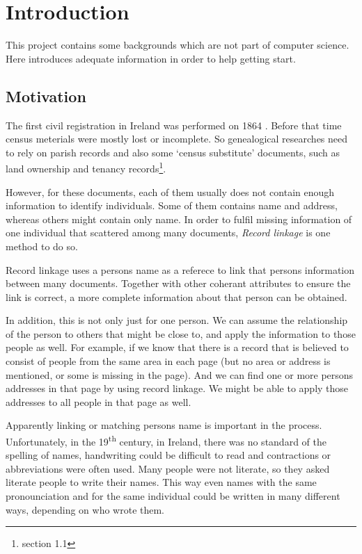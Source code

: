 \chapter{Introduction}
\label{ch:introduction}

This project contains some backgrounds which are not part of computer science.
Here introduces adequate information in order to help getting start.

\section{Motivation}

The first civil registration in Ireland was performed on 1864 \cite[]{irishregistration}.
Before that time census meterials were mostly lost or incomplete. So genealogical researches
need to rely on parish records and also some `census substitute' documents,
such as land ownership and tenancy records\footnote{\cite[]{adamw} section 1.1}.

However, for these documents, each of them usually does not contain enough
information to identify individuals. Some of them contains name and address,
whereas others might contain only name. In order to fulfil missing information
of one individual that scattered among many documents, \emph{Record linkage}
is one method to do so.


Record linkage uses a person\textquotesingle s name as a referece to link that
person\textquotesingle s information between many documents.
Together with other coherant attributes to ensure the link is correct, a
more complete information about that person can be obtained.

In addition, this is not only just for one person. We can assume the relationship
of the person to others that might be close to, and apply the information
to those people as well. For example, if we know that there is a record
that is believed to consist of people from the same area in each page \cite[]{morpeth}
(but no area or address is mentioned, or some is missing in the page). And we can find
one or more person\textquotesingle s addresses in that page by using record linkage.
We might be able to apply those addresses to all people in that page as well.

Apparently linking or matching person\textquotesingle s name is important in the process.
Unfortunately, in the 19\textsuperscript{th} century, in Ireland, there was no standard
of the spelling of names, handwriting could be difficult to read
and contractions or abbreviations were often used. Many people were not literate,
so they asked literate people to write their names.
This way even names with the same pronounciation and for the same individual
could be written in many different ways, depending on who wrote them.

